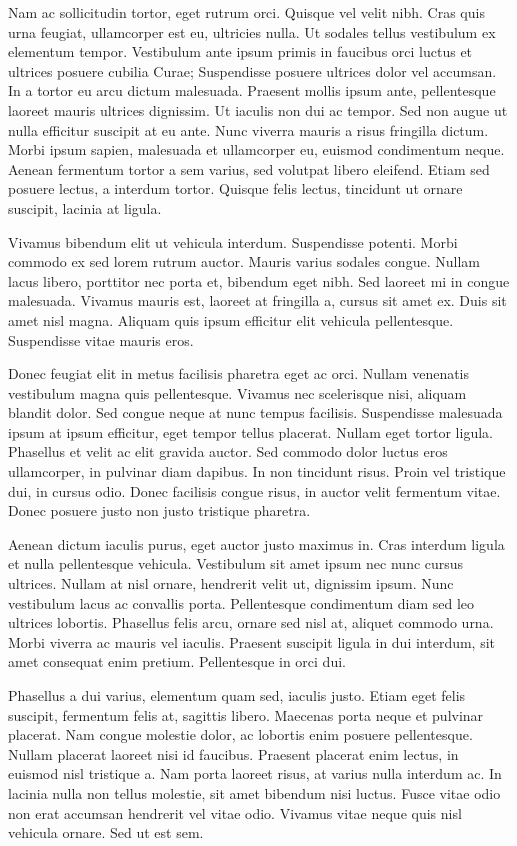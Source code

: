 \documentclass[a4paper,twoside,notitlepage,openright,11pt]{report}
\begin{document}
Nam ac sollicitudin tortor, eget rutrum orci. Quisque vel velit nibh. Cras quis urna feugiat, ullamcorper est eu, ultricies nulla. Ut sodales tellus vestibulum ex elementum tempor. Vestibulum ante ipsum primis in faucibus orci luctus et ultrices posuere cubilia Curae; Suspendisse posuere ultrices dolor vel accumsan. In a tortor eu arcu dictum malesuada. Praesent mollis ipsum ante, pellentesque laoreet mauris ultrices dignissim. Ut iaculis non dui ac tempor. Sed non augue ut nulla efficitur suscipit at eu ante. Nunc viverra mauris a risus fringilla dictum. Morbi ipsum sapien, malesuada et ullamcorper eu, euismod condimentum neque. Aenean fermentum tortor a sem varius, sed volutpat libero eleifend. Etiam sed posuere lectus, a interdum tortor. Quisque felis lectus, tincidunt ut ornare suscipit, lacinia at ligula.

Vivamus bibendum elit ut vehicula interdum. Suspendisse potenti. Morbi commodo ex sed lorem rutrum auctor. Mauris varius sodales congue. Nullam lacus libero, porttitor nec porta et, bibendum eget nibh. Sed laoreet mi in congue malesuada. Vivamus mauris est, laoreet at fringilla a, cursus sit amet ex. Duis sit amet nisl magna. Aliquam quis ipsum efficitur elit vehicula pellentesque. Suspendisse vitae mauris eros.

Donec feugiat elit in metus facilisis pharetra eget ac orci. Nullam venenatis vestibulum magna quis pellentesque. Vivamus nec scelerisque nisi, aliquam blandit dolor. Sed congue neque at nunc tempus facilisis. Suspendisse malesuada ipsum at ipsum efficitur, eget tempor tellus placerat. Nullam eget tortor ligula. Phasellus et velit ac elit gravida auctor. Sed commodo dolor luctus eros ullamcorper, in pulvinar diam dapibus. In non tincidunt risus. Proin vel tristique dui, in cursus odio. Donec facilisis congue risus, in auctor velit fermentum vitae. Donec posuere justo non justo tristique pharetra.

Aenean dictum iaculis purus, eget auctor justo maximus in. Cras interdum ligula et nulla pellentesque vehicula. Vestibulum sit amet ipsum nec nunc cursus ultrices. Nullam at nisl ornare, hendrerit velit ut, dignissim ipsum. Nunc vestibulum lacus ac convallis porta. Pellentesque condimentum diam sed leo ultrices lobortis. Phasellus felis arcu, ornare sed nisl at, aliquet commodo urna. Morbi viverra ac mauris vel iaculis. Praesent suscipit ligula in dui interdum, sit amet consequat enim pretium. Pellentesque in orci dui.

Phasellus a dui varius, elementum quam sed, iaculis justo. Etiam eget felis suscipit, fermentum felis at, sagittis libero. Maecenas porta neque et pulvinar placerat. Nam congue molestie dolor, ac lobortis enim posuere pellentesque. Nullam placerat laoreet nisi id faucibus. Praesent placerat enim lectus, in euismod nisl tristique a. Nam porta laoreet risus, at varius nulla interdum ac. In lacinia nulla non tellus molestie, sit amet bibendum nisi luctus. Fusce vitae odio non erat accumsan hendrerit vel vitae odio. Vivamus vitae neque quis nisl vehicula ornare. Sed ut est sem.
\end{document}
